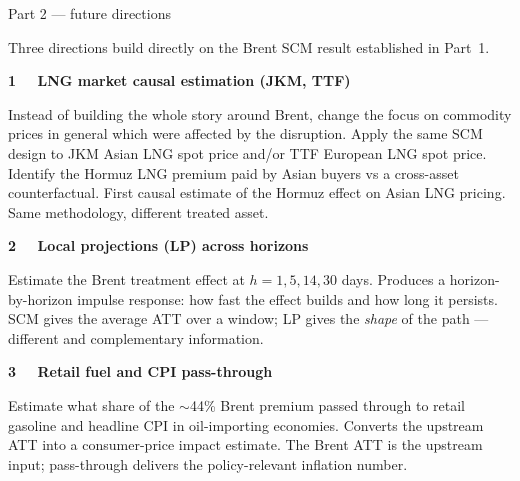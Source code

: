 \documentclass[aspectratio=169,11pt]{beamer}
\newcommand{\hd}[1]{\textbf{#1}}
\begin{document}
\begin{frame}[shrink=5]{Part 2 --- future directions}
  \scriptsize
  \vspace{0.15em}

  Three directions build directly on the Brent SCM result established in Part~1.


  \vspace{0.5em}
  \hd{1 \ \ LNG market causal estimation (JKM, TTF)}

  \textcolor{muted} {Instead of building the whole story around Brent, change the focus on commodity prices in general which were affected by the disruption. Apply the same SCM design to JKM Asian LNG spot price and/or TTF European LNG spot price.
  Identify the Hormuz LNG premium paid by Asian buyers vs a cross-asset counterfactual.}
  First causal estimate of the Hormuz effect on Asian LNG pricing.
  Same methodology, different treated asset.



  \vspace{0.4em}
  \hd{2 \ \ Local projections (LP) across horizons}
  
  \textcolor{muted}{Estimate the Brent treatment effect at
  $h = 1, 5, 14, 30$ days.}
  Produces a horizon-by-horizon impulse response: how fast the effect builds
  and how long it persists.
  SCM gives the average ATT over a window; LP gives the \emph{shape} of the
  path --- different and complementary information.

  
  \vspace{0.5em}
  \hd{3 \ \ Retail fuel and CPI pass-through}
  
  \textcolor{muted}{Estimate what share of the $\sim$44\% Brent premium
  passed through to retail gasoline and headline CPI in oil-importing economies.}
  Converts the upstream ATT into a consumer-price impact estimate.
  The Brent ATT is the upstream input; pass-through delivers the
  policy-relevant inflation number.

  \vspace{0.5em}
  \begin{center}
  \end{center}

\end{frame}
\end{document}
